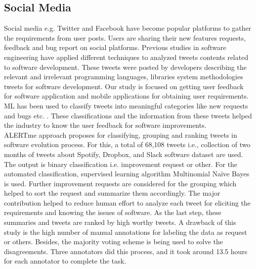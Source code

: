\subsection{Social Media}
Social media e.g. Twitter and Facebook have become popular platforms to gather the
requirements from user posts. Users are sharing their new features requests, feedback and bug
report on social platforms. Previous studies \cite{Singer:2014} \cite{Prasetyo} \cite{Achananuparp:2012} in software engineering have applied different techniques to analyzed tweets contents related to software development. These tweets were posted by developers describing the relevant and irrelevant programming languages, libraries system methodologies tweets for software development. Our study is focused on getting user feedback for software application and mobile applications for obtaining user requirements. ML has been used to classify tweets into meaningful
categories like new requests and bugs etc. \cite{guzman2017} \cite{williams2017} . These classifications and the information
from these tweets helped the industry to know the user feedback for software improvements.\\

	ALERTme \cite{guzman2017} approach proposes for classifying, grouping and ranking tweets in software
evolution process. For this, a total of 68,108 tweets i.e., collection of two months of tweets about
Spotify, Dropbox, and Slack software dataset are used. The output is binary classification i.e.
improvement request or other. For the automated classification, supervised learning algorithm Multinomial Naïve Bayes is used.  
Further improvement requests are considered for the
grouping which helped to sort the request and summarize them accordingly. The major contribution helped to reduce human
effort to analyze each tweet for eliciting the requirements and knowing the issues of software. As the last step, these summaries and tweets are ranked by high
worthy tweets. A drawback of this study is the high number of manual annotations for labeling
the data as request or others. Besides, the majority voting scheme is being used to solve the
disagreements. Three annotators did this process, and it took around 13.5 hours for each
annotator to complete the task.\\

